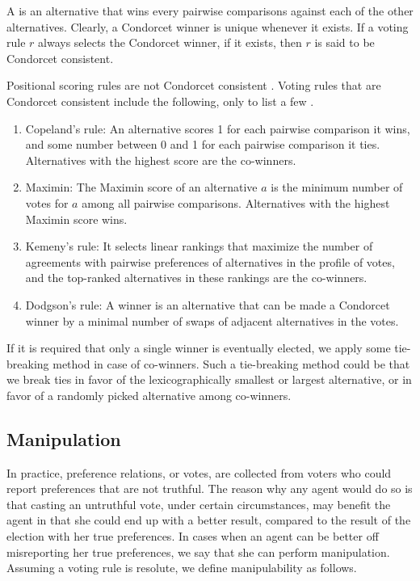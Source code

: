 A  is an alternative that wins every pairwise comparisons
against each of the other alternatives.
Clearly, a Condorcet winner is unique whenever it exists.
If a voting rule $r$ always selects the Condorcet winner,
if it exists, then $r$ is said to be Condorcet consistent.

Positional scoring rules are not Condorcet consistent \cite{Fis}.
Voting rules that are Condorcet consistent include the following,
only to list a few \cite{Brandt:COMSOC}.
\begin{enumerate} \itemsep -4pt
	\item Copeland's rule: An alternative scores 1 for each pairwise comparison
				it wins, and some number between 0 and 1 for each pairwise comparison
				it ties.  Alternatives with the highest score are the co-winners.
	\item Maximin: The Maximin score of an alternative $a$ is the minimum number of
				votes for $a$ among all pairwise comparisons.  
				Alternatives with the highest Maximin score wins.
	\item Kemeny's rule: It selects linear rankings that maximize the number of agreements 
				with pairwise preferences of alternatives in the profile of votes, and
				the top-ranked alternatives in these rankings are the co-winners.
	\item Dodgson's rule: A winner is an alternative that can be made a Condorcet winner 
				by a minimal number of swaps of adjacent alternatives in the votes.
\end{enumerate}

If it is required that only a single winner is eventually elected,
we apply some tie-breaking method in case of co-winners.
Such a tie-breaking method could be that we break ties in favor of
the lexicographically smallest or largest alternative, or in favor of
a randomly picked alternative among co-winners.







\subsection{Manipulation \label{sec:manip}}
In practice, preference relations, or votes, are collected from voters
who could report preferences that are not truthful.
The reason why any agent would do so is that
casting an untruthful vote, under certain circumstances,
may benefit the agent in that she could end up with
a better result, compared to the result of the election
with her true preferences.
In cases when an agent can be better off misreporting her
true preferences, we say that she can perform manipulation.
Assuming a voting rule is resolute,
we define manipulability as follows.

